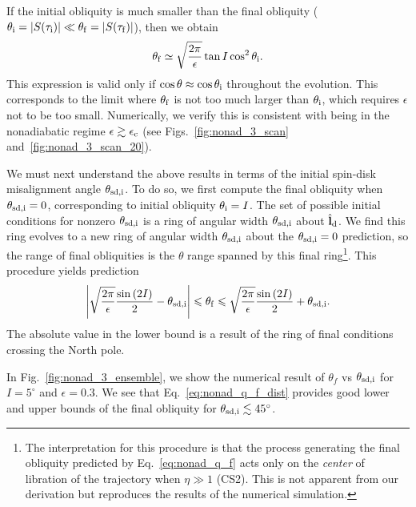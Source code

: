 \documentclass[
        fleqn,
        usenatbib,
    ]{mnras}
\newcommand*{\abs}[1]{\left|#1\right|}
\newcommand*{\bm}[1]{\boldsymbol{\mathbf{#1}}}
\newcommand*{\uv}[1]{\hat{\bm{#1}}}
\newcommand*{\p}[1]{\left(#1\right)}
\begin{document}
If the initial obliquity is much smaller than the final obliquity ($\theta_{\rm
i} = \abs{S(\tau_{\rm i})} \ll \theta_{\rm f} = \abs{S(\tau_{\rm f})}$), then we
obtain
\begin{equation}
    \theta_{\rm f}\simeq \sqrt{\frac{2\pi}{\epsilon}}\tan I\cos^2\theta_{\rm i}.
        \label{eq:nonad_q_f}
\end{equation}
This expression is valid only if $\cos \theta \approx \cos \theta_{\rm i}$
throughout the evolution. This corresponds to the limit where $\theta_{\rm f}$
is not too much larger than $\theta_{\rm i}$, which requires $\epsilon$ not to
be too small. Numerically, we verify this is consistent with being in the
nonadiabatic regime $\epsilon \gtrsim \epsilon_{\rm c}$ (see
Figs.~\ref{fig:nonad_3_scan} and~\ref{fig:nonad_3_scan_20}).

We must next understand the above results in terms of the initial spin-disk
misalignment angle $\theta_{\rm sd, i}$. To do so, we first compute the final
obliquity when $\theta_{\rm sd, i} = 0$, corresponding to initial obliquity
$\theta_{\rm i} = I$. The set of possible initial conditions
for nonzero $\theta_{\rm sd, i}$ is a ring of angular width $\theta_{\rm sd, i}$
about $\uv{l}_{\rm d}$. We find this ring evolves to a new ring of angular width
$\theta_{\rm sd, i}$ about the $\theta_{\rm sd, i} = 0$ prediction, so the range
of final obliquities is the $\theta$ range spanned by this final
ring\footnote{The interpretation for this procedure is that the process
generating the final obliquity predicted by Eq.~\eqref{eq:nonad_q_f} acts only
on the \emph{center} of libration of the trajectory when $\eta \gg 1$ (CS2).
This is not apparent from our derivation but reproduces the results of the
numerical simulation.}. This procedure yields prediction
\begin{equation}
    \abs{\sqrt{\frac{2\pi}{\epsilon}}\frac{\sin \p{2I}}{2}
        - \theta_{\rm sd, i}}
    \leq \theta_{\rm f}
    \leq \sqrt{\frac{2\pi}{\epsilon}}\frac{\sin\p{2I}}{2} + \theta_{\rm sd, i}
    .\label{eq:nonad_q_f_dist}
\end{equation}
The absolute value in the lower bound is a result of the ring of final
conditions crossing the North pole.

In Fig.~\ref{fig:nonad_3_ensemble}, we show the numerical result of $\theta_f$
vs $\theta_{\rm sd,i}$ for $I = 5^\circ$ and $\epsilon = 0.3$. We see that
Eq.~\eqref{eq:nonad_q_f_dist} provides good lower and upper bounds of the final
obliquity for $\theta_{\rm sd,i} \lesssim 45^\circ$.
\end{document}
